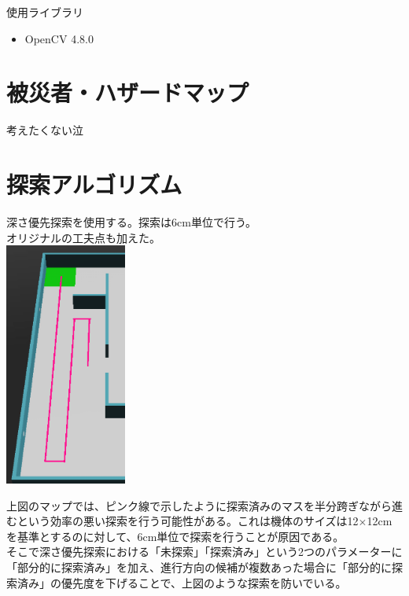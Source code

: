 \documentclass[uplatex,dvipdfmx,a4paper]{jsarticle}
\begin{document}
  \noindent
  使用ライブラリ
  \begin{itemize}
    \item OpenCV 4.8.0
  \end{itemize}

  \section{被災者・ハザードマップ}
  考えたくない泣

  \section{探索アルゴリズム}
  深さ優先探索を使用する。探索は6cm単位で行う。\\
  オリジナルの工夫点も加えた。\\
  \includegraphics[width=40mm]{Photo/feagure1.png}

  上図のマップでは、ピンク線で示したように探索済みのマスを半分跨ぎながら進むという効率の悪い探索を行う可能性がある。これは機体のサイズは12$\times$12cmを基準とするのに対して、6cm単位で探索を行うことが原因である。\\
  そこで深さ優先探索における「未探索」「探索済み」という2つのパラメーターに「部分的に探索済み」を加え、進行方向の候補が複数あった場合に「部分的に探索済み」の優先度を下げることで、上図のような探索を防いでいる。\\
\end{document}
